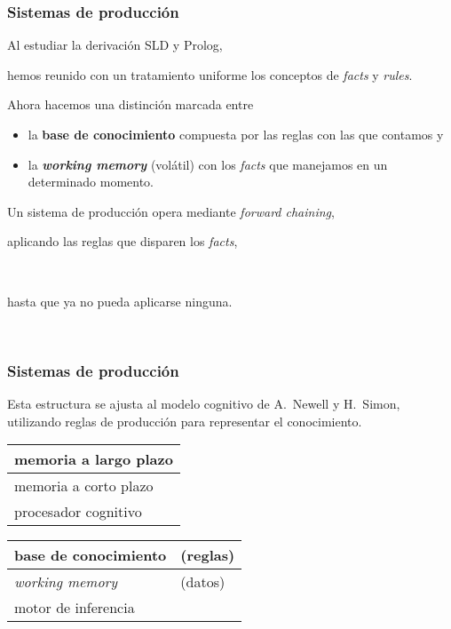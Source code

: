 \documentclass{beamer}    %
\begin{document}
\begin{frame}[t]
 \frametitle{Sistemas de producción}

 Al estudiar la derivación SLD y Prolog,\\[2mm]
 \hfill\parbox{.85\linewidth}{hemos reunido con un
   tratamiento uniforme los conceptos de \emph{facts} y
   \emph{rules}.}
 \vspace{4mm}

 Ahora hacemos una distinción marcada entre
 \begin{itemize}
 \item
 la {\bf base de conocimiento} compuesta por las reglas con
 las que contamos y
 \item
 la {\bf \emph{working memory}} (volátil) con los
 \emph{facts} que manejamos en un determinado momento.
 \end{itemize}
 \vspace{4mm}

 \pause

 Un sistema de producción opera mediante \emph{forward
   chaining},\\[2mm]
 \hfill\parbox{.85\linewidth}{aplicando las reglas que
   disparen los \emph{facts},}\\[2mm]
 \hfill\parbox{.7\linewidth}{hasta que ya no pueda aplicarse
   ninguna.}\\[2mm]
\end{frame}

\begin{frame}
 \frametitle{Sistemas de producción}

 Esta estructura se ajusta al modelo cognitivo de {\sc
   A. Newell} y {\sc H. Simon}{\small, utilizando reglas de
 producción para representar el conocimiento.}
 \vspace{7mm}

 {\renewcommand\arraystretch{1.5}
 \begin{minipage}[t]{.35\linewidth}
 \begin{tabular}{|l|} \hline
 memoria a largo plazo  \\ \hline
 memoria a corto plazo  \\ \hline
 procesador cognitivo  \\ \hline
 \end{tabular}
 \end{minipage}\hfill
 \begin{minipage}[t]{.6\linewidth}
 \begin{tabular}{|ll|} \hline
 base de conocimiento & (reglas) \\ \hline
 \emph{working memory} & (datos) \\ \hline
 motor de inferencia & \\ \hline
 \end{tabular}
 \end{minipage}}
\end{frame}
\end{document}
